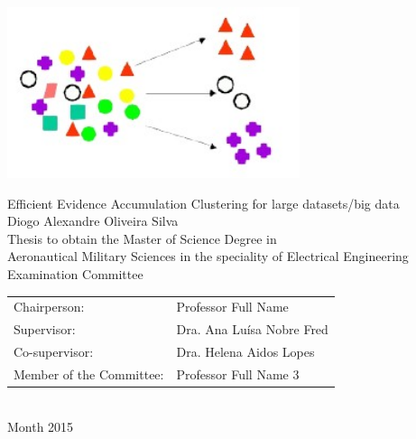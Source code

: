 \begin{center}
%
\vspace{2.5cm}
\includegraphics[height=50mm]{Figures/clustering.jpg}

\vspace{1.0cm}
{\FontLb Efficient Evidence Accumulation Clustering for large datasets/big data} \\
\vspace{2.7cm}
{\FontMb Diogo Alexandre Oliveira Silva} \\
\vspace{2.0cm}
{\FontSn Thesis to obtain the Master of Science Degree in} \\
\vspace{0.3cm}
{\FontLb Aeronautical Military Sciences in the speciality of Electrical Engineering} \\
\vspace{1.1cm}
\vspace{1.1cm}
{\FontMb Examination Committee} \\
\vspace{0.3cm}
{\FontSn %
\begin{tabular}{ll}
Chairperson: & Professor Full Name \\
Supervisor: & Dra. Ana Luísa Nobre Fred \\
Co-supervisor: & Dra. Helena Aidos Lopes \\
Member of the Committee: & Professor Full Name 3
\end{tabular} } \\
\vspace{1.5cm}
{\FontMb Month 2015} \\
%
\end{center}

\cleardoublepage

